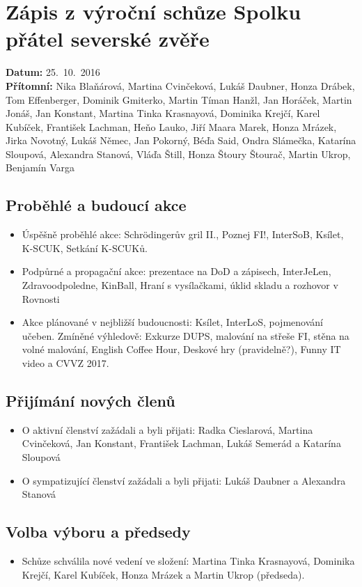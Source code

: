 \documentclass[11pt,a4paper]{article}
\begin{document}
\section*{Zápis z výroční schůze Spolku přátel severské zvěře}
\textbf{Datum:} 25.~10.~2016\\
\textbf{Přítomní:} Nika Blaňárová, Martina Cvinčeková, Lukáš Daubner, Honza Drábek, Tom Effenberger, Dominik Gmiterko, Martin Tíman Hanžl, Jan Horáček, Martin Jonáš, Jan Konstant, Martina Tinka Krasnayová, Dominika Krejčí, Karel Kubíček, František Lachman, Heňo Lauko, Jiří Maara Marek, Honza Mrázek, Jirka Novotný, Lukáš Němec, Jan Pokorný, Béďa Said, Ondra Slámečka, Katarína Sloupová, Alexandra Stanová, Vláďa Štill, Honza Štoury Štourač, Martin Ukrop, Benjamín Varga

\subsection*{Proběhlé a budoucí akce}
\begin{itemize}[itemsep=0pt]
\item Úspěšně proběhlé akce: Schrödingerův gril II., Poznej FI!, InterSoB, Ksílet, K-SCUK, Setkání K-SCUKů.
\item Podpůrné a propagační akce: prezentace na DoD a zápisech, InterJeLen, Zdravoodpoledne, KinBall, Hraní s vysílačkami, úklid skladu a rozhovor v Rovnosti
\item Akce plánované v nejbližší budoucnosti: Ksílet, InterLoS, pojmenování učeben. Zmíněné výhledově: Exkurze DUPS, malování na střeše FI, stěna na volné malování, English Coffee Hour, Deskové hry (pravidelně?), Funny IT video a CVVZ 2017.
\end{itemize}

\subsection*{Přijímání nových členů}
\begin{itemize}[itemsep=0pt]
\item O aktivní členství zažádali a byli přijati: Radka Cieslarová, Martina Cvinčeková, Jan Konstant, František Lachman, Lukáš Semerád a Katarína Sloupová
\item O sympatizující členství zažádali a byli přijati: Lukáš Daubner a Alexandra Stanová
\end{itemize}

\subsection*{Volba výboru a předsedy}
\begin{itemize}[itemsep=0pt]
\item Schůze schválila nové vedení ve složení: Martina Tinka Krasnayová, Dominika Krejčí, Karel Kubíček, Honza Mrázek a Martin Ukrop (předseda).
\end{itemize}
\end{document}
